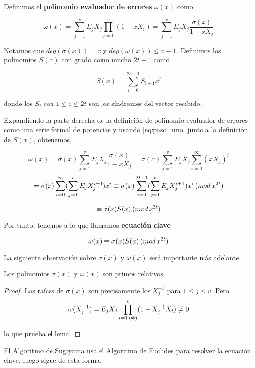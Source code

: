 \begin{definition}
Definimos el \textbf{polinomio evaluador de errores $\omega(x)$} como

\[
\omega(x) = \sum_{j=1}^v E_jX_j \prod_{j=1}^v (1-xX_i) = \sum_{j=1}^v E_jX_j \frac{\sigma(x)}{1-xX_j}
\]

\end{definition}

Notamos que $deg(\sigma(x)) = v$ y $deg(\omega(x)) \leq v-1$. Definimos los polinomios $S(x)$ con grado como mucho $2t-1$ como 

\[
S(x) = \sum_{i=0}^{2t-1} S_{i+1}x^i
\]

donde los $S_i$ con $ 1 \leq i \leq 2t$ son los síndromes del vector recibido.

Expandiendo la parte derecha de la definición de polinomio evaluador de errores como una serie formal de potencias y usando \ref{eq:paso_uno} junto a la definición de $S(x)$, obtenemos,

\[ 
\omega(x) = \sigma(x)\sum_{j=1}^v E_jX_j \frac{\sigma(x)}{1-xX_j} = \sigma(x) \sum_{j=1}^v E_jX_j \sum_{i=0}^\infty (xX_j)^i 
\]
\[
 = \sigma(x) \sum_{i=0}^\infty ( \sum_{j=1}^v E_jX_j^{i+1})x^i \equiv \sigma(x) \sum_{i=0}^{2t-1} ( \sum_{j=1}^v E_jX_j^{i+1})x^i \thinspace (mod \thinspace x^{2t})  \]
 
 \[ \equiv \sigma(x)S(x) \thinspace (mod \thinspace x^{2t}) \]

Por tanto, tenemos a lo que llamamos \textbf{ecuación clave}


\[ \omega(x) \equiv \sigma(x)S(x) \thinspace (mod \thinspace x^{2t}) \]

La siguiente observación sobre $\sigma(x)$ y $\omega(x)$ será importante más adelante.

\begin{lemma}
\label{le:primos_ec_clave}
Los polinomios $\sigma(x)$ y $\omega(x)$ son primos relativos.
\end{lemma}

\begin{proof}
Las raíces de $\sigma(x)$ son precisamente los $X_j^{-1}$ para $ 1 \leq j \leq v$. Pero 
\[
\omega(X_j^{-1}) = E_jX_j \prod_{i=1 \thinspace i \neq j}^v (1-X_j^{-1}X_i) \neq 0
\]

lo que prueba el lema.
\end{proof}

El Algoritmo de Sugiyama usa el Algoritmo de Euclides para resolver la ecuación clave, luego sigue de esta forma.

